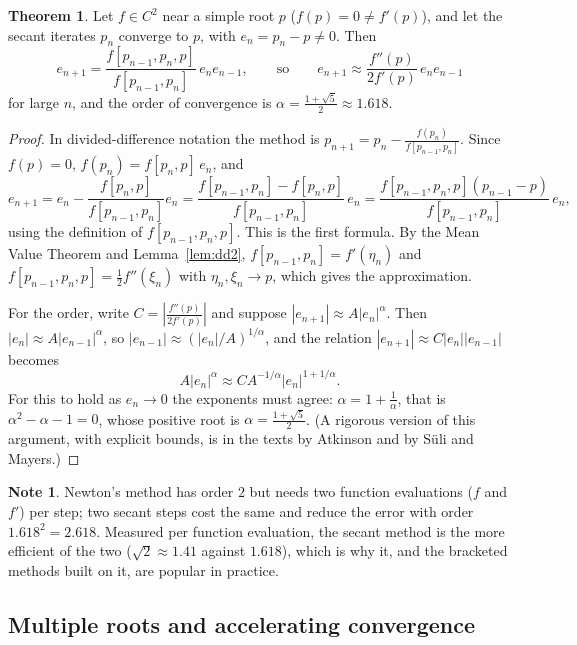 \documentclass[11pt,a4paper]{article}
\numberwithin{equation}{section}
\theoremstyle{definition}
\newtheorem{thm}{Theorem}[subsection]
\newtheorem*{note}{Note}
\begin{document}
\begin{thm}
\label{thm:secant}
Let $f\in C^2$ near a simple root $p$ ($f(p) = 0\neq f'(p)$), and let the secant iterates $p_n$ converge to $p$, with $e_n = p_n-p\neq0$.
Then
$$e_{n+1} = \frac{f[p_{n-1},p_n,p]}{f[p_{n-1},p_n]}\,e_ne_{n-1},\qquad\text{so}\qquad e_{n+1}\approx\frac{f''(p)}{2f'(p)}\,e_ne_{n-1}$$
for large $n$, and the order of convergence is $\alpha = \frac{1+\sqrt5}{2}\approx1.618$.
\end{thm}

\begin{proof}
In divided-difference notation the method is $p_{n+1} = p_n-\frac{f(p_n)}{f[p_{n-1},p_n]}$. Since $f(p) = 0$, $f(p_n) = f[p_n,p]\,e_n$, and
$$e_{n+1} = e_n-\frac{f[p_n,p]}{f[p_{n-1},p_n]}e_n = \frac{f[p_{n-1},p_n]-f[p_n,p]}{f[p_{n-1},p_n]}\,e_n = \frac{f[p_{n-1},p_n,p](p_{n-1}-p)}{f[p_{n-1},p_n]}\,e_n,$$
using the definition of $f[p_{n-1},p_n,p]$. This is the first formula. By the Mean Value Theorem and Lemma~\ref{lem:dd2},
$f[p_{n-1},p_n] = f'(\eta_n)$ and $f[p_{n-1},p_n,p] = \frac12f''(\xi_n)$ with $\eta_n,\xi_n\longrightarrow p$, which gives the
approximation.

For the order, write $C = \left|\frac{f''(p)}{2f'(p)}\right|$ and suppose $|e_{n+1}|\approx A|e_n|^\alpha$. Then $|e_n|\approx A|e_{n-1}|^\alpha$, so
$|e_{n-1}|\approx(|e_n|/A)^{1/\alpha}$, and the relation $|e_{n+1}|\approx C|e_n||e_{n-1}|$ becomes
$$A|e_n|^\alpha\approx C A^{-1/\alpha}|e_n|^{1+1/\alpha}.$$
For this to hold as $e_n\longrightarrow0$ the exponents must agree: $\alpha = 1+\frac1\alpha$, that is $\alpha^2-\alpha-1 = 0$, whose positive
root is $\alpha = \frac{1+\sqrt5}{2}$. (A rigorous version of this argument, with explicit bounds, is in the texts by Atkinson and by
S\"uli and Mayers.)
\end{proof}

\begin{note}
Newton's method has order $2$ but needs two function evaluations ($f$ and $f'$) per step; two secant steps cost the same and reduce the
error with order $1.618^2 = 2.618$. Measured per function evaluation, the secant method is the more efficient of the two
($\sqrt2\approx1.41$ against $1.618$), which is why it, and the bracketed methods built on it, are popular in practice.
\end{note}


\subsection{Multiple roots and accelerating convergence}
\label{sec:multiple}
\end{document}
